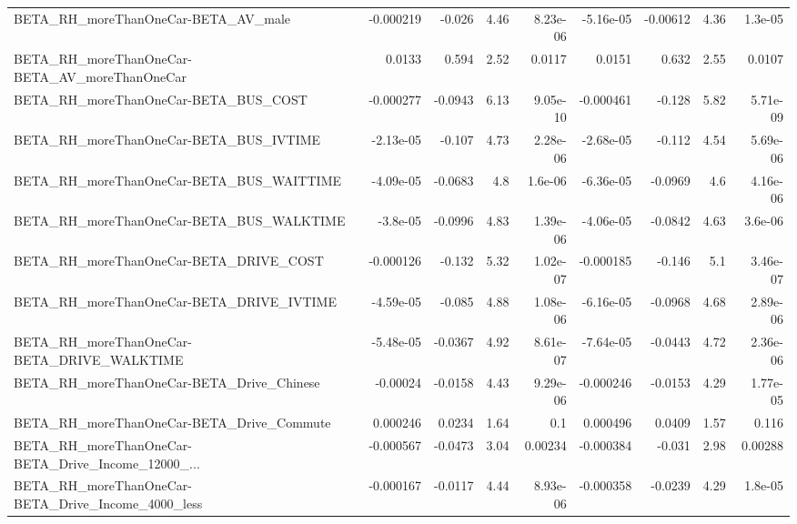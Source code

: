 \begin{tabular}{lrrrrrrrr}
BETA\_RH\_moreThanOneCar-BETA\_AV\_male                &   -0.000219 &       -0.026 &      4.46 & 8.23e-06 &  -5.16e-05 &    -0.00612 &         4.36 &       1.3e-05 \\
BETA\_RH\_moreThanOneCar-BETA\_AV\_moreThanOneCar      &      0.0133 &        0.594 &      2.52 &   0.0117 &     0.0151 &       0.632 &         2.55 &        0.0107 \\
BETA\_RH\_moreThanOneCar-BETA\_BUS\_COST               &   -0.000277 &      -0.0943 &      6.13 & 9.05e-10 &  -0.000461 &      -0.128 &         5.82 &      5.71e-09 \\
BETA\_RH\_moreThanOneCar-BETA\_BUS\_IVTIME             &   -2.13e-05 &       -0.107 &      4.73 & 2.28e-06 &  -2.68e-05 &      -0.112 &         4.54 &      5.69e-06 \\
BETA\_RH\_moreThanOneCar-BETA\_BUS\_WAITTIME           &   -4.09e-05 &      -0.0683 &       4.8 &  1.6e-06 &  -6.36e-05 &     -0.0969 &          4.6 &      4.16e-06 \\
BETA\_RH\_moreThanOneCar-BETA\_BUS\_WALKTIME           &    -3.8e-05 &      -0.0996 &      4.83 & 1.39e-06 &  -4.06e-05 &     -0.0842 &         4.63 &       3.6e-06 \\
BETA\_RH\_moreThanOneCar-BETA\_DRIVE\_COST             &   -0.000126 &       -0.132 &      5.32 & 1.02e-07 &  -0.000185 &      -0.146 &          5.1 &      3.46e-07 \\
BETA\_RH\_moreThanOneCar-BETA\_DRIVE\_IVTIME           &   -4.59e-05 &       -0.085 &      4.88 & 1.08e-06 &  -6.16e-05 &     -0.0968 &         4.68 &      2.89e-06 \\
BETA\_RH\_moreThanOneCar-BETA\_DRIVE\_WALKTIME         &   -5.48e-05 &      -0.0367 &      4.92 & 8.61e-07 &  -7.64e-05 &     -0.0443 &         4.72 &      2.36e-06 \\
BETA\_RH\_moreThanOneCar-BETA\_Drive\_Chinese          &    -0.00024 &      -0.0158 &      4.43 & 9.29e-06 &  -0.000246 &     -0.0153 &         4.29 &      1.77e-05 \\
BETA\_RH\_moreThanOneCar-BETA\_Drive\_Commute          &    0.000246 &       0.0234 &      1.64 &      0.1 &   0.000496 &      0.0409 &         1.57 &         0.116 \\
BETA\_RH\_moreThanOneCar-BETA\_Drive\_Income\_12000\_... &   -0.000567 &      -0.0473 &      3.04 &  0.00234 &  -0.000384 &      -0.031 &         2.98 &       0.00288 \\
BETA\_RH\_moreThanOneCar-BETA\_Drive\_Income\_4000\_less &   -0.000167 &      -0.0117 &      4.44 & 8.93e-06 &  -0.000358 &     -0.0239 &         4.29 &       1.8e-05 \\

\end{tabular}
